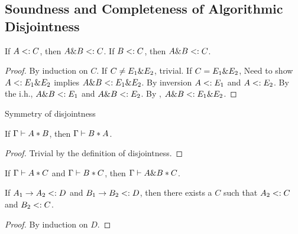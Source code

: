 \subsection{Soundness and Completeness of Algorithmic Disjointness}

\begin{theorem}
  If $A <: C$, then $A \& B <: C$.
  If $B <: C$, then $A \& B <: C$.
\end{theorem}


\begin{proof}
  By induction on $C$.
  If $C \neq E_1 \& E_2$, trivial.
  If $C = E_1 \& E_2$,
  Need to show $A <: E_1 \& E_2$ implies $A \& B <: E_1 \& E_2$.
  By inversion $A <: E_1$ and $A <: E_2$.
  By the i.h., $A \& B <: E_1$ and $A \& B <: E_2$.
  By , $A \& B <: E_1 \& E_2$.
\end{proof}

\begin{lemma}{Symmetry of disjointness}
  \label{lemma:symmetry-of-disjointness}

  If $\Gamma \vdash A * B$, then $\Gamma \vdash B * A$.
\end{lemma}

\begin{proof}
  Trivial by the definition of disjointness.
\end{proof}

\begin{theorem}
  \label{theorem:disjoint-intersect}

  If $\Gamma \vdash A * C$ and $\Gamma \vdash B * C$,
  then $\Gamma \vdash A \& B * C$.
\end{theorem}

\begin{lemma}
  \label{lemma:common-supertype}

  If $A_1 \to A_2 <: D$ and $B_1 \to B_2 <: D$,
  then there exists a $C$ such that $A_2 <: C$ and $B_2 <: C$.
\end{lemma}

\begin{proof}
  By induction on $D$.
\end{proof}

\algodissoundness*

